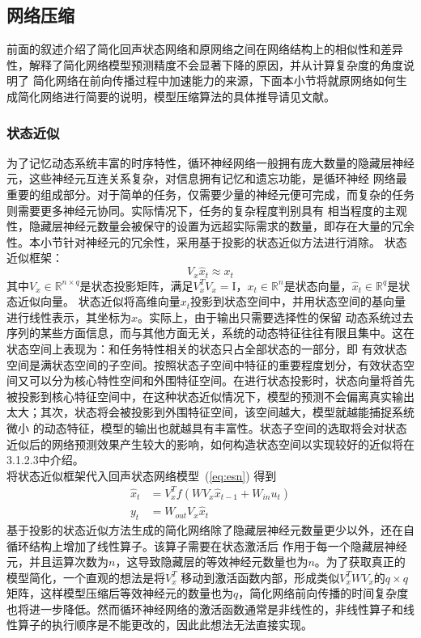 \subsection{网络压缩}
前面的叙述介绍了简化回声状态网络和原网络之间在网络结构上的相似性和差异性，解释了简化网络模型预测精度不会显著下降的原因，并从计算复杂度的角度说明了
简化网络在前向传播过程中加速能力的来源，下面本小节将就原网络如何生成简化网络进行简要的说明，模型压缩算法的具体推导请见文献。
\subsubsection{状态近似}
为了记忆动态系统丰富的时序特性，循环神经网络一般拥有庞大数量的隐藏层神经元，这些神经元互连关系复杂，对信息拥有记忆和遗忘功能，是循环神经
网络最重要的组成部分。对于简单的任务，仅需要少量的神经元便可完成，而复杂的任务则需要更多神经元协同。实际情况下，任务的复杂程度判别具有
相当程度的主观性，隐藏层神经元数量会被保守的设置为远超实际需求的数量，即存在大量的冗余性。本小节针对神经元的冗余性，采用基于投影的状态近似方法进行消除。
状态近似框架：
\begin{equation}
	V_x \widehat{x}_{t} \approx x_{t}
\end{equation}
其中\(V_x \in \mathbb{R}^{n \times q}\)是状态投影矩阵，满足\(V_x^T  V_x = \mathrm{I}\)，\(x_{t} \in \mathbb{R}^n\)是状态向量，\(\widehat{x}_t \in \mathbb{R}^q\)是状态近似向量。
状态近似将高维向量\(x_t\)投影到状态空间中，并用状态空间的基向量进行线性表示，其坐标为\(\widehat{x}\)。实际上，由于输出只需要选择性的保留
动态系统过去序列的某些方面信息，而与其他方面无关，系统的动态特征往往有限且集中。这在状态空间上表现为：和任务特性相关的状态只占全部状态的一部分，即
有效状态空间是满状态空间的子空间。按照状态子空间中特征的重要程度划分，有效状态空间又可以分为核心特性空间和外围特征空间。在进行状态投影时，状态向量将首先
被投影到核心特征空间中，在这种状态近似情况下，模型的预测不会偏离真实输出太大；其次，状态将会被投影到外围特征空间，该空间越大，模型就越能捕捉系统微小
的动态特征，模型的输出也就越具有丰富性。状态子空间的选取将会对状态近似后的网络预测效果产生较大的影响，如何构造状态空间以实现较好的近似将在3.1.2.3中介绍。\\
将状态近似框架代入回声状态网络模型~(\ref{eq:esn}) 得到
\begin{equation}
	\begin{split}
		\widehat{x}_{t} & = V_x^T  f(W V_x  \widehat{x}_{t-1} + W_{in}  u_t)	\\
					y_t & = W_{out} V_x  \widehat{x}_t
	\end{split}
\end{equation}
基于投影的状态近似方法生成的简化网络除了隐藏层神经元数量更少以外，还在自循环结构上增加了线性算子。该算子需要在状态激活后
作用于每一个隐藏层神经元，并且运算次数为\(n\)，这导致隐藏层的等效神经元数量也为\(n\)。为了获取真正的模型简化，一个直观的想法是将\(V_x^T\)
移动到激活函数内部，形成类似\(V_x^T  W  V_x\)的\(q \times q\)矩阵，这样模型压缩后等效神经元的数量也为\(q\)，简化网络前向传播的时间复杂度
也将进一步降低。然而循环神经网络的激活函数通常是非线性的，非线性算子和线性算子的执行顺序是不能更改的，因此此想法无法直接实现。

